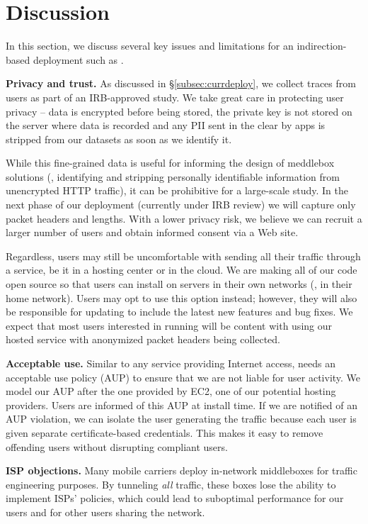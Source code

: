 \section{Discussion}
\label{sec:discussion}
In this section, we discuss several key issues and limitations for an indirection-based 
deployment such as \meddle.
 
\noindent\textbf{Privacy and trust.} As discussed in \S\ref{subsec:currdeploy}, we 
collect traces from users as part of an IRB-approved study. We take great care in 
protecting user privacy -- data is encrypted before being stored, the private key is 
not stored on the server where data is recorded and any PII sent in the 
clear by apps is stripped from our datasets as soon as we identify it. 

While this fine-grained data is useful for informing the design of meddlebox solutions (\eg, 
identifying and stripping personally identifiable information from unencrypted 
HTTP traffic), it can be prohibitive for a large-scale study. In the next phase of 
our deployment (currently under IRB review) we will capture only packet headers 
and lengths. With a lower privacy risk, we believe we can recruit a larger number 
of users and obtain informed consent via a Web site. 

Regardless, users may still be uncomfortable with sending all their traffic through a 
\meddle service, be it in a hosting center or in the cloud. We are making all of 
our code open source so that users can install \meddle on servers in their 
own networks (\eg, in their home network). Users may opt to use this option instead; however, they will also be responsible 
for updating \meddle to include the latest new features and bug fixes. We expect 
that most users interested in running \meddle will be content with using our hosted 
\meddle service with anonymized packet headers being collected. 

\noindent\textbf{Acceptable use.} Similar to any service providing Internet access, 
\meddle needs an acceptable use policy (AUP) to ensure that we are not liable for 
user activity. We model our AUP after the one provided by EC2, one of our potential 
hosting providers. Users are informed of this AUP at install time. If we are notified 
of an AUP violation, we can isolate the user generating the traffic because each 
user is given separate certificate-based credentials. This makes it easy to 
remove offending users without disrupting compliant users.

\noindent\textbf{ISP objections.} Many mobile carriers deploy in-network middleboxes 
for traffic engineering purposes. By tunneling \emph{all} traffic, these boxes lose the 
ability to implement ISPs' policies, which could lead to suboptimal performance for 
our users and for other users sharing the network. 

